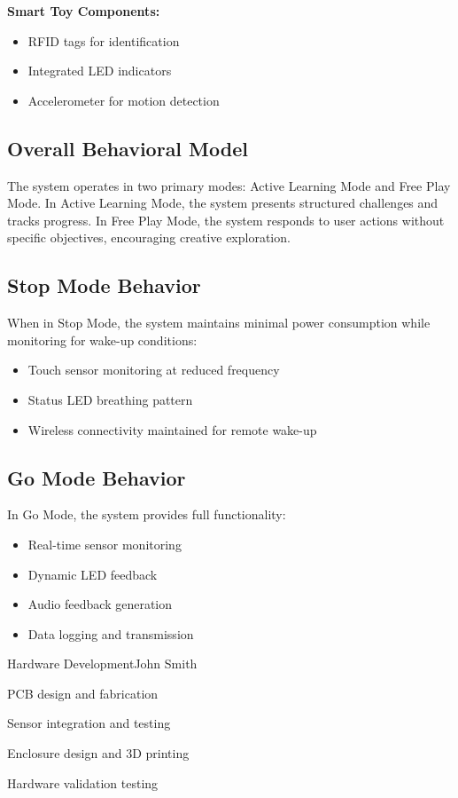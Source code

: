 \documentclass[final]{designreport}
\begin{document}
\textbf{Smart Toy Components:}
\begin{itemize}
    \item RFID tags for identification
    \item Integrated LED indicators
    \item Accelerometer for motion detection
\end{itemize}

\behavioralmodels

\subsection{Overall Behavioral Model}
The system operates in two primary modes: Active Learning Mode and Free Play Mode. In Active Learning Mode, the system presents structured challenges and tracks progress. In Free Play Mode, the system responds to user actions without specific objectives, encouraging creative exploration.

\subsection{Stop Mode Behavior}
When in Stop Mode, the system maintains minimal power consumption while monitoring for wake-up conditions:
\begin{itemize}
    \item Touch sensor monitoring at reduced frequency
    \item Status LED breathing pattern
    \item Wireless connectivity maintained for remote wake-up
\end{itemize}

\subsection{Go Mode Behavior}
In Go Mode, the system provides full functionality:
\begin{itemize}
    \item Real-time sensor monitoring
    \item Dynamic LED feedback
    \item Audio feedback generation
    \item Data logging and transmission
\end{itemize}

\projectplan

\workbreakdown

\begin{subproject}{Hardware Development}{John Smith}
    \item PCB design and fabrication
    \item Sensor integration and testing
    \item Enclosure design and 3D printing
    \item Hardware validation testing
\end{subproject}
\end{document}
